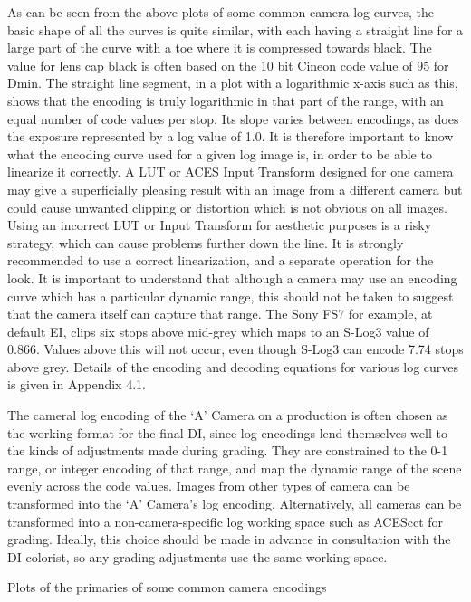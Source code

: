   
As can be seen from the above plots of some common camera log curves, the basic shape of all the curves is quite similar, with each having a straight line for a large part of the curve with a toe where it is compressed towards black. The value for lens cap black is often based on the 10 bit Cineon code value of 95 for Dmin. The straight line segment, in a plot with a logarithmic x-axis such as this, shows that the encoding is truly logarithmic in that part of the range, with an equal number of code values per stop. Its slope varies between encodings, as does the exposure represented by a log value of 1.0. It is therefore important to know what the encoding curve used for a given log image is, in order to be able to linearize it correctly. A LUT or ACES Input Transform designed for one camera may give a superficially pleasing result with an image from a different camera  but could cause unwanted clipping or distortion which is not obvious on all images. Using an incorrect LUT or Input Transform for aesthetic purposes is a risky strategy, which can cause problems further down the line. It is strongly recommended to use a correct linearization, and a separate operation for the look. It is important to understand that although a camera may use an encoding curve which has a particular dynamic range, this should not be taken to suggest that the camera itself can capture that range. The Sony FS7 for example, at default EI, clips six stops above mid-grey which maps to an S-Log3 value of 0.866. Values above this will not occur, even though S-Log3 can encode 7.74 stops above grey. Details of the encoding and decoding equations for various log curves is given in Appendix 4.1.

The cameral log encoding of the ‘A’ Camera on a production is often chosen as the working format for the final DI, since log encodings lend themselves well to the kinds of adjustments made during grading. They are constrained to the 0-1 range, or integer encoding of that range, and map the dynamic range of the scene evenly across the code values. Images from other types of camera can be transformed into the ‘A’ Camera’s log encoding. Alternatively, all cameras can be transformed into a non-camera-specific log working space such as ACEScct for grading. Ideally, this choice should be made in advance in consultation with the DI colorist, so any grading adjustments use the same working space.
    

Plots of the primaries of some common camera encodings

